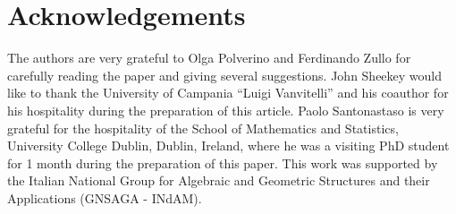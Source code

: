 \documentclass[11pt]{amsart}
\theoremstyle{definition}
\begin{document}
\section*{Acknowledgements}
The authors are very grateful to Olga Polverino and Ferdinando Zullo for carefully reading the paper and giving several suggestions. John Sheekey would like to thank the University
of Campania ``Luigi Vanvitelli” and his coauthor for his
hospitality during the preparation of this article.
Paolo Santonastaso is very grateful for the hospitality of the School of Mathematics and Statistics, University College Dublin, Dublin, Ireland, where he was a visiting PhD student for 1 month during the preparation of this paper.
This work was supported by the Italian National Group for Algebraic and Geometric Structures and their Applications (GNSAGA - INdAM).




\end{document}
